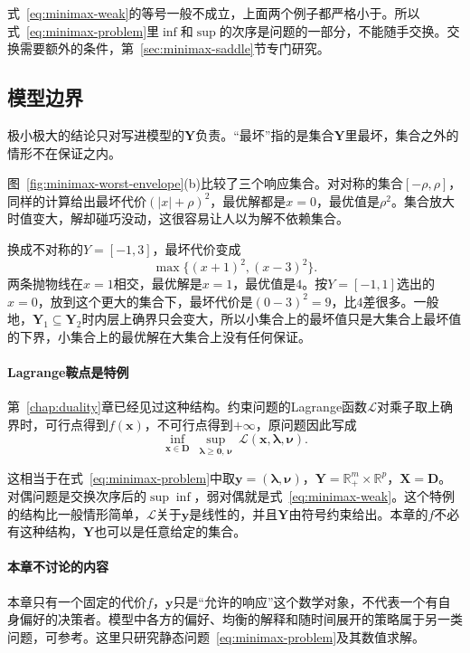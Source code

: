 式~\eqref{eq:minimax-weak}的等号一般不成立，上面两个例子都严格小于。所以式~\eqref{eq:minimax-problem}里$\inf$和$\sup$的次序是问题的一部分，不能随手交换。交换需要额外的条件，第~\ref{sec:minimax-saddle}节专门研究。

\subsection{模型边界}
\label{sec:minimax-boundary}

极小极大的结论只对写进模型的$\bm{Y}$负责。“最坏”指的是集合$\bm{Y}$里最坏，集合之外的情形不在保证之内。

图~\ref{fig:minimax-worst-envelope}(b)比较了三个响应集合。对对称的集合$[-\rho,\rho]$，同样的计算给出最坏代价$(\lvert x\rvert+\rho)^2$，最优解都是$x=0$，最优值是$\rho^2$。集合放大时值变大，解却碰巧没动，这很容易让人以为解不依赖集合。

换成不对称的$Y=[-1,3]$，最坏代价变成
\[
 \max\{(x+1)^2,(x-3)^2\}.
\]
两条抛物线在$x=1$相交，最优解是$x=1$，最优值是$4$。按$Y=[-1,1]$选出的$x=0$，放到这个更大的集合下，最坏代价是$(0-3)^2=9$，比$4$差很多。一般地，$\bm{Y}_1\subseteq\bm{Y}_2$时内层上确界只会变大，所以小集合上的最坏值只是大集合上最坏值的下界，小集合上的最优解在大集合上没有任何保证。

\paragraph{Lagrange鞍点是特例}
第~\ref{chap:duality}章已经见过这种结构。约束问题的Lagrange函数$\mathcal{L}$对乘子取上确界时，可行点得到$f(\bm{x})$，不可行点得到$+\infty$，原问题因此写成
\[
 \inf_{\bm{x}\in\bm{D}}\ \sup_{\bm{\lambda}\geq\bm{0},\,\bm{\nu}}\ \mathcal{L}(\bm{x},\bm{\lambda},\bm{\nu}).
\]

这相当于在式~\eqref{eq:minimax-problem}中取$\bm{y}=(\bm{\lambda},\bm{\nu})$，$\bm{Y}=\mathbb{R}^m_{+}\times\mathbb{R}^p$，$\bm{X}=\bm{D}$。对偶问题是交换次序后的$\sup\inf$，弱对偶就是式~\eqref{eq:minimax-weak}。这个特例的结构比一般情形简单，$\mathcal{L}$关于$\bm{y}$是线性的，并且$\bm{Y}$由符号约束给出。本章的$f$不必有这种结构，$\bm{Y}$也可以是任意给定的集合。

\paragraph{本章不讨论的内容}
本章只有一个固定的代价$f$，$\bm{y}$只是“允许的响应”这个数学对象，不代表一个有自身偏好的决策者。模型中各方的偏好、均衡的解释和随时间展开的策略属于另一类问题，可参考。这里只研究静态问题~\eqref{eq:minimax-problem}及其数值求解。

